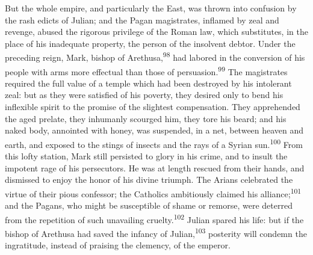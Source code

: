 But the whole empire, and particularly the East, was thrown into
confusion by the rash edicts of Julian; and the Pagan
magistrates, inflamed by zeal and revenge, abused the rigorous
privilege of the Roman law, which substitutes, in the place of
his inadequate property, the person of the insolvent debtor.
Under the preceding reign, Mark, bishop of Arethusa,\textsuperscript{98} had
labored in the conversion of his people with arms more effectual
than those of persuasion.\textsuperscript{99} The magistrates required the full
value of a temple which had been destroyed by his intolerant
zeal: but as they were satisfied of his poverty, they desired
only to bend his inflexible spirit to the promise of the
slightest compensation. They apprehended the aged prelate, they
inhumanly scourged him, they tore his beard; and his naked body,
annointed with honey, was suspended, in a net, between heaven and
earth, and exposed to the stings of insects and the rays of a
Syrian sun.\textsuperscript{100} From this lofty station, Mark still persisted to
glory in his crime, and to insult the impotent rage of his
persecutors. He was at length rescued from their hands, and
dismissed to enjoy the honor of his divine triumph. The Arians
celebrated the virtue of their pious confessor; the Catholics
ambitiously claimed his alliance;\textsuperscript{101} and the Pagans, who might
be susceptible of shame or remorse, were deterred from the
repetition of such unavailing cruelty.\textsuperscript{102} Julian spared his
life: but if the bishop of Arethusa had saved the infancy of
Julian,\textsuperscript{103} posterity will condemn the ingratitude, instead of
praising the clemency, of the emperor.



